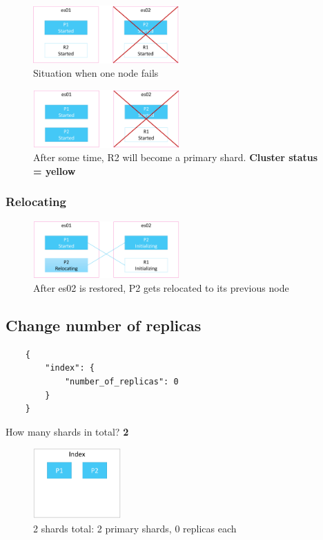 \documentclass{article}
\begin{document}
\begin{figure}[H]
    \centering
    \includegraphics[width=0.5\textwidth]{shard-alloc-started3.png}
    \caption{Situation when one node fails}
\end{figure}
\begin{figure}[H]
    \centering
    \includegraphics[width=0.5\textwidth]{shard-alloc-started4.png}
    \caption{After some time, R2 will become a primary shard. \textbf{Cluster status = yellow}}
\end{figure}

\subsubsection{Relocating}

\begin{figure}[H]
    \centering
    \includegraphics[width=0.5\textwidth]{shard-alloc-relocating.png}
    \caption{After es02 is restored, P2 gets relocated to its previous node}
\end{figure}

\subsection{Change number of replicas}

\begin{verbatim}
    {
        "index": {
            "number_of_replicas": 0
        }
    }
\end{verbatim}

How many shards in total? \textbf{2}

\begin{figure}[H]
    \centering
    \includegraphics[width=0.3\textwidth]{change-number-of-replicas.png}
    \caption{2 shards total: 2 primary shards, 0 replicas each}
\end{figure}
\end{document}
